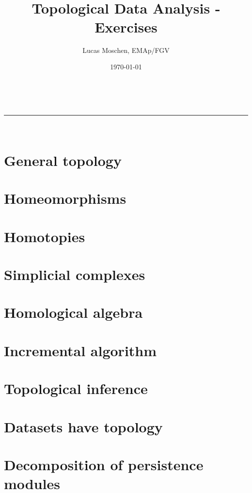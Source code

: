 \documentclass[a4paper,11pt]{article}
\title{Topological Data Analysis - Exercises}
\author{Lucas Moschen, EMAp/FGV}
\date{\today}
\makeatletter
\newcommand{\linia}{\rule{\linewidth}{0.5pt}}
\theoremstyle{mytheor}
\theoremstyle{mytheor}
\theoremstyle{remark}
\renewcommand{\maketitle}{
    \begin{center}
        \vspace{2ex}
        {\huge \textsc{\@title}}
        \vspace{1ex}
        \\
        \linia\\
        \@author \hfill \@date
        \vspace{4ex}
    \end{center}
}
\makeatother
\begin{document}
\maketitle

\tableofcontents

\section{General topology}



\newpage

\section{Homeomorphisms}



\newpage

\section{Homotopies}



\newpage

\section{Simplicial complexes}



\newpage

\section{Homological algebra}



\newpage

\section{Incremental algorithm}



\newpage

\section{Topological inference}



\newpage

\section{Datasets have topology}



\newpage

\section{Decomposition of persistence modules}



\newpage
\end{document}
